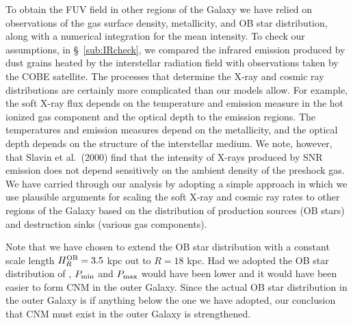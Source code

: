 \documentclass[12pt,preprint,flushrt]{aastex}
\begin{document}
To obtain the FUV field in other regions of the Galaxy we have relied
on observations
of the gas surface density, metallicity, and OB star distribution, along with
a numerical integration for the mean intensity. To check our assumptions,
in \S~\ref{sub:IRcheck}, we compared the infrared emission produced
by dust grains heated by the interstellar radiation field
with observations taken by the COBE satellite.
The processes that determine the X-ray and cosmic ray distributions
are certainly more complicated than our models allow.
For example, the soft X-ray flux depends on the temperature and emission
measure in the  hot ionized gas component and the optical depth to
the emission regions.
The temperatures and emission measures depend on the metallicity,
and the optical depth depends on the structure of the interstellar
medium. We note, however, that Slavin et al.\ (2000) find that
the intensity of
X-rays produced by SNR emission does not
depend sensitively on the ambient density of the preshock gas.
We have carried through our analysis by adopting
a simple approach in which we
use plausible arguments for scaling the soft X-ray
and cosmic ray rates to other regions of the Galaxy based on the
distribution of production sources
(OB stars) and destruction sinks (various gas components).

Note that we have chosen to extend the OB star distribution with
a constant scale length $H_R^{\rm OB} = 3.5$ kpc out to
$R=18$ kpc.
Had we adopted the OB star distribution of \cite{bron00},
$P_{\rm min}$ and $P_{\rm max}$ would have been lower and it
would have been easier to form CNM in the outer Galaxy.
Since the actual OB star distribution in the outer Galaxy is
if anything below the one we have adopted, our conclusion
that CNM must exist in the outer Galaxy is strengthened.
\end{document}
